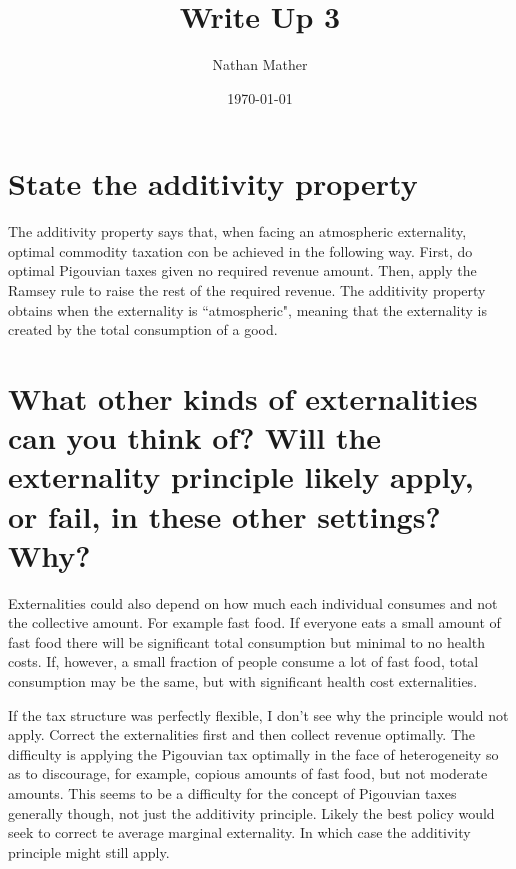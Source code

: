 \documentclass[11pt]{article}
\title{Write Up 3} %
\author{Nathan Mather} %
\date{\today} %
\begin{document}
	
	
	\maketitle %
	

\section{State the additivity property}
The additivity property says that, when facing an atmospheric externality, optimal commodity taxation con be achieved in the following way. First, do optimal Pigouvian taxes given no required revenue amount. Then, apply the Ramsey rule to raise the rest of the required revenue. The additivity property obtains when the externality is ``atmospheric", meaning that the externality is created by the total consumption of a good.

\section{ What other kinds of externalities can you think of? Will the externality principle likely apply, or fail, in these other settings? Why?} 
Externalities could also depend on how much each individual consumes and not the collective amount. For example fast food. If everyone eats a small amount of fast food there will be significant total consumption but minimal to no health costs. If, however, a small fraction of people consume a lot of fast food, total consumption may be the same, but with significant health cost externalities. \par 

If the tax structure was perfectly flexible, I don't see why the principle would not apply. Correct the externalities first and then collect revenue optimally. The difficulty is applying the Pigouvian tax optimally in the face of heterogeneity so as to discourage, for example, copious amounts of fast food, but not moderate amounts. This seems to be a difficulty for the concept of Pigouvian taxes generally though, not just the additivity principle. Likely the best policy would seek to correct te average marginal externality. In which case the additivity principle might still apply.   
 
\end{document}
